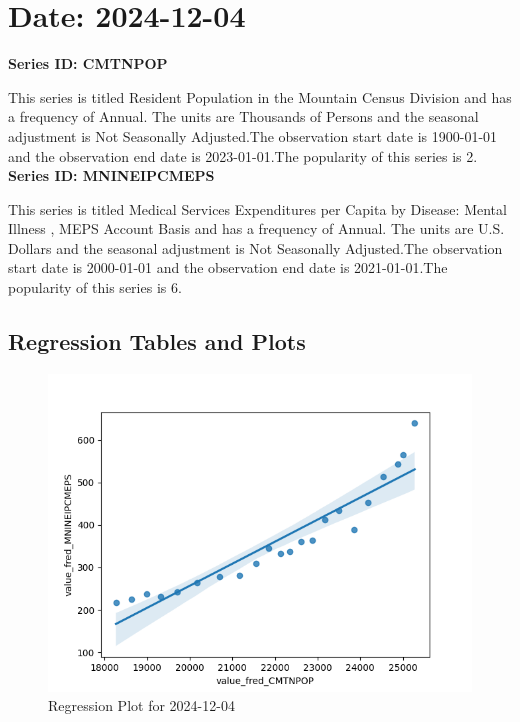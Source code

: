 \section{Date: 2024-12-04}
\noindent \textbf{Series ID: CMTNPOP} 

\noindent This series is titled Resident Population in the Mountain Census Division and has a frequency of Annual. The units are Thousands of Persons and the seasonal adjustment is Not Seasonally Adjusted.The observation start date is 1900-01-01 and the observation end date is 2023-01-01.The popularity of this series is 2. \\ 

\noindent \textbf{Series ID: MNINEIPCMEPS} 

\noindent This series is titled Medical Services Expenditures per Capita by Disease: Mental Illness , MEPS Account Basis and has a frequency of Annual. The units are U.S. Dollars and the seasonal adjustment is Not Seasonally Adjusted.The observation start date is 2000-01-01 and the observation end date is 2021-01-01.The popularity of this series is 6. \\ 

\subsection{Regression Tables and Plots}


\begin{figure}
\centering
\includegraphics[scale = 0.9]{plots/plot_2024-12-04.png}
\caption{Regression Plot for 2024-12-04}
\end{figure}
\newpage
